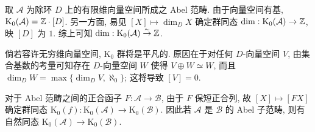 \begin{example}
	取 $\mathcal{A}$ 为除环 $D$ 上的有限维向量空间所成之 Abel 范畴. 由于向量空间有基, $\mathrm{K}_0(\mathcal{A}) = \mathbb{Z} \cdot [D]$. 另一方面, 易见 $[X] \mapsto \dim_D X$ 确定群同态 $\dim: \mathrm{K}_0(\mathcal{A}) \to \mathbb{Z}$, 映 $[D]$ 为 $1$. 综上可知 $\dim: \mathrm{K}_0(\mathcal{A}) \stackrel{\sim}{\rightarrow} \mathbb{Z}$.
	
	倘若容许无穷维向量空间, $\mathrm{K}_0$ 群将是平凡的. 原因在于对任何 $D$-向量空间 $V$, 由集合基数的考量可知存在 $D$-向量空间 $W$ 使得 $V \oplus W \simeq W$, 而且 $\dim_D W = \max\{ \dim_D V, \aleph_0 \}$; 这将导致 $[V] = 0$.
\end{example}

对于 Abel 范畴之间的正合函子 $F: \mathcal{A} \to \mathcal{B}$, 由于 $F$ 保短正合列, 故 $[X] \mapsto [FX]$ 确定群同态 $\mathrm{K}_0(f): \mathrm{K}_0(\mathcal{A}) \to \mathrm{K}_0(\mathcal{B})$. 因此若 $\mathcal{A}$ 是 $\mathcal{B}$ 的 Abel 子范畴, 则有自然同态 $\mathrm{K}_0(\mathcal{A}) \to \mathrm{K}_0(\mathcal{B})$.

